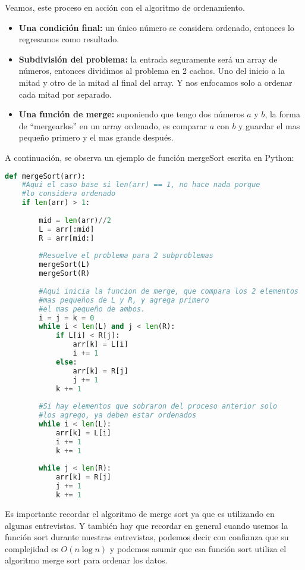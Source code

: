 Veamos, este proceso en acción con el algoritmo de ordenamiento. 

\begin{itemize}
    \item \textbf{Una condición final:} un único número se considera ordenado, entonces lo regresamos como resultado.
    \item \textbf{Subdivisión del problema:} la entrada seguramente será un array de números,  entonces dividimos al problema en 2 cachos. Uno del inicio a la mitad y otro de la mitad al final del array. Y nos enfocamos solo a ordenar cada mitad por separado.
    \item \textbf{Una función de merge:} suponiendo que tengo dos números $a$ y $b$, la forma de ``mergearlos'' en un array ordenado, es comparar $a$ con $b$ y guardar el mas pequeño primero y el mas grande después. 
\end{itemize}

A continuación, se observa un ejemplo de función mergeSort escrita en Python:
\begin{lstlisting}[language=Python, caption=Merge sort]
def mergeSort(arr):
    #Aqui el caso base si len(arr) == 1, no hace nada porque
    #lo considera ordenado
    if len(arr) > 1:
  
        mid = len(arr)//2
        L = arr[:mid]
        R = arr[mid:]
 
        #Resuelve el problema para 2 subproblemas       
        mergeSort(L)
        mergeSort(R)
  
        #Aqui inicia la funcion de merge, que compara los 2 elementos
        #mas pequeños de L y R, y agrega primero 
        #el mas pequeño de ambos.
        i = j = k = 0
        while i < len(L) and j < len(R):
            if L[i] < R[j]:
                arr[k] = L[i]
                i += 1
            else:
                arr[k] = R[j]
                j += 1
            k += 1
  
        #Si hay elementos que sobraron del proceso anterior solo
        #los agrego, ya deben estar ordenados
        while i < len(L):
            arr[k] = L[i]
            i += 1
            k += 1
  
        while j < len(R):
            arr[k] = R[j]
            j += 1
            k += 1
\end{lstlisting}

Es importante recordar el algoritmo de merge sort ya que es utilizando en algunas entrevistas. Y también hay que recordar en general cuando usemos la función sort durante nuestras entrevistas, podemos decir con confianza que su complejidad es $O(n\log n)$ y podemos asumir que esa función sort utiliza el algoritmo merge sort para ordenar los datos.

